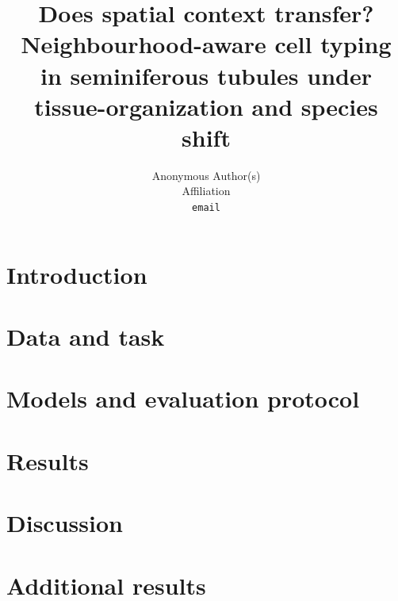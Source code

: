 \documentclass{article}
\title{Does spatial context transfer? Neighbourhood-aware cell typing in seminiferous tubules under tissue-organization and species shift}
\author{%
  Anonymous Author(s)\\
  Affiliation\\
  \texttt{email}
}
\begin{document}
\maketitle

\begin{abstract}

\end{abstract}

\section{Introduction}


\section{Data and task}


\section{Models and evaluation protocol}


\section{Results}


\section{Discussion}





\clearpage
\appendix
\section{Additional results}

\end{document}
